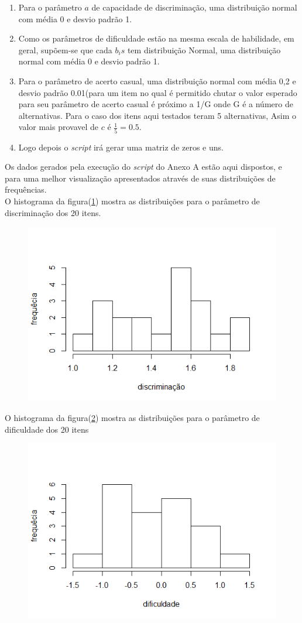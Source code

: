 	    \begin{enumerate}
	        \item  Para o parâmetro $a$ de capacidade de  discriminação, uma distribuição normal com média 0 e desvio padrão 1.
	        \item 	Como os parâmetros de dificuldade estão na mesma escala de habilidade, em geral, supõem-se que cada $b_is$ tem distribuição Normal,  uma distribuição normal com média 0 e desvio padrão 1.
	        \item 	Para o parâmetro de acerto casual, uma distribuição normal com média 0,2 e desvio padrão 0.01(para um item no qual é permitido chutar o valor esperado para seu parâmetro de acerto casual é próximo a 1/G onde G é a número de alternativas. Para o caso dos itens aqui testados teram 5 alternativas, Asim o valor mais provavel de $c$ é $\frac{1}{5} = 0.5$.
	        \item Logo depois o \textit{script} irá gerar uma matriz de zeros e uns.\\
	    \end{enumerate}
    Os dados gerados pela execução do  \textit{script} do Anexo A estão aqui dispostos, e para uma melhor visualização apresentados através de suas distribuições de frequências.\\
	O histograma da figura(\ref{fig:a}) mostra as distribuições para o parâmetro de discriminação dos 20 itens.\\
	\begin{figure}[!h]
		\centering
		\includegraphics[width=0.6\linewidth]{img/a}
		\caption{}
		\label{fig:a}
	\end{figure}
	
	\newpage
	
	O histograma da figura(\ref{fig:b}) mostra as distribuições para o parâmetro de dificuldade dos 20 itens
	
	\begin{figure}[!h]
		\centering
		\includegraphics[width=0.6\linewidth]{img/b}
		\caption{}
		\label{fig:b}
	\end{figure}
	
